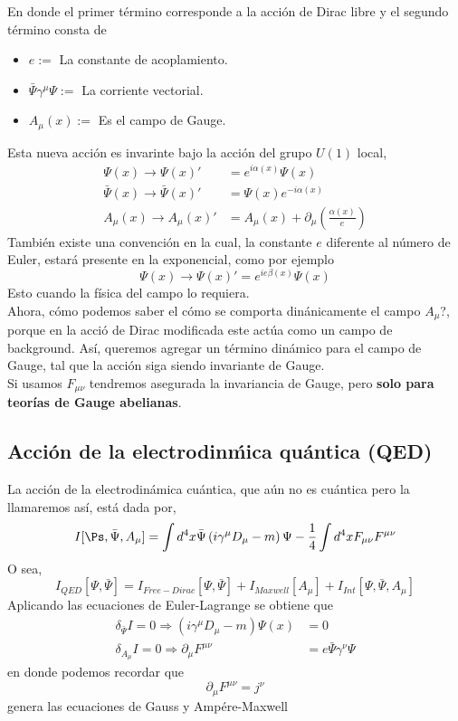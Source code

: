\documentclass[../main.tex]{subfiles}
\begin{document}
  En donde el primer término corresponde a la acción de Dirac libre y el segundo término consta de 
  \begin{itemize}
    \item $e:=$ La constante de acoplamiento.
    \item $\bar{\Psi}\gamma^\mu\Psi:=$ La corriente vectorial.
    \item $A_\mu(x):=$ Es el campo de Gauge. 
  \end{itemize}
    Esta nueva acción es invarinte bajo la acción del grupo $U(1)$ local,
    \begin{align*}
      \Psi(x)\rightarrow \Psi(x)' & = e^{i\alpha(x)} \Psi(x) \\
      \bar{\Psi}(x) \rightarrow \bar{\Psi}(x)' & = \Psi(x)e^{-i\alpha(x)} \\
      A_\mu(x)\rightarrow A_\mu(x)' & = A_\mu(x) + \partial_\mu \left( \frac{\alpha(x)}{e} \right)
    \end{align*}
También existe una convención en la cual, la constante $e$ diferente al número de Euler, estará presente en la exponencial, como por ejemplo
\begin{equation*}
  \Psi(x)\rightarrow \Psi(x)' = e^{ie\beta(x)}\Psi(x)
\end{equation*}
Esto cuando la física del campo lo requiera.\\
Ahora, cómo podemos saber el cómo se comporta dinánicamente el campo $A_\mu$?, porque en la acció de Dirac modificada este actúa como un campo de background. Así, queremos agregar un término dinámico para el campo de Gauge, tal que la acción siga siendo invariante de Gauge. \\
Si usamos $F_{\mu\nu}$ tendremos asegurada la invariancia de Gauge, pero \textbf{solo para teorías de Gauge abelianas}. \\
\subsection{Acción de la electrodinḿica quántica (QED)}
La acción de la electrodinámica cuántica, que aún no es cuántica pero la llamaremos así, está dada por,
\begin{equation}
  I[\Ps,\bar{\Psi},A_\mu] = \int d^4x \bar{\Psi} \left( i\gamma^\mu D_\mu - m \right)\Psi - \frac{1}{4} \int d^4x F_{\mu\nu} F^{\mu\nu}
 \end{equation}
O sea,
\begin{equation}
  I_{QED}[\Psi,\bar{\Psi}] = I_{Free-Dirac} [\Psi,\bar{\Psi}] + I_{Maxwell} [A_\mu] + I_{Int}[\Psi,\bar{\Psi},A_\mu]
 \end{equation}
Aplicando las ecuaciones de Euler-Lagrange se obtiene que
\begin{align}
  \delta_{\bar{\Psi}}I  = 0 \Rightarrow \left( i\gamma^\mu D_\mu  -m  \right)\Psi(x) & = 0 \\
  \delta_{A_\mu}I = 0\Rightarrow \partial_\mu F^{\mu\nu} & = e\bar{\Psi}\gamma^\nu \Psi
\end{align}
en donde podemos recordar que 
\begin{equation}
  \partial_\mu F^{\mu\nu} = j^\nu 
 \end{equation}
 genera las ecuaciones de Gauss y Ampére-Maxwell
\end{document}

